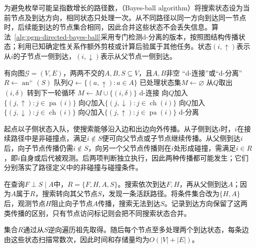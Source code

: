 为避免枚举可能呈指数增长的路径数，（Bayes-ball algorithm）将搜索状态设为当前节点及到达方向，相同状态只处理一次。从不同路径以同一方向到达同一节点时，后续能到达的节点集合相同，因此合并这些状态不会丢失信息。算法~\ref{alg:pgm-directed-bayes-ball}采用专门检测d-分离的版本，按照图结构传播状态；利用已知确定性关系作额外剪枝或计算后验属于其他任务。状态$(i,\uparrow)$表示从$i$的子节点一侧到达，$(i,\downarrow)$表示从父节点一侧到达。

\begin{algorithm}
  \label{alg:pgm-directed-bayes-ball}
  \begin{algorithmic}[1]
    \Require 有向图$\mathcal{G}=(V,E)$，两两不交的$A,B,S\subseteq V$，且$A,B$非空
    \Ensure “d-连接”或“d-分离”
    \State $R\gets\operatorname{an}^{+}(S)$
    \State 队列$Q\gets\{(a,\uparrow):a\in A\}$
    \State 已处理状态集$M\gets\varnothing$
      \State 从$Q$取出$(i,\delta)$
        \State 转到下一轮循环
      \EndIf
      \State $M\gets M\cup\{(i,\delta)\}$
        \State \Return d-连接
      \EndIf
        \State 向$Q$加入$\{(j,\uparrow):j\in\operatorname{pa}(i)\}$
        \State 向$Q$加入$\{(j,\downarrow):j\in\operatorname{ch}(i)\}$
      \ElsIf{$\delta=\downarrow$}
          \State 向$Q$加入$\{(j,\downarrow):j\in\operatorname{ch}(i)\}$
        \EndIf
          \State 向$Q$加入$\{(j,\uparrow):j\in\operatorname{pa}(i)\}$
        \EndIf
      \EndIf
    \EndWhile
    \State \Return d-分离
  \end{algorithmic}
\end{algorithm}

起点以子侧状态入队，使搜索能够沿入边和出边向外传播。从子侧到达$i$时，$i$在接续路径中是非碰撞点，满足$i\notin S$便可向父节点或子节点继续传播。从父侧到达$i$后，向子节点传播仍需$i\notin S$，向另一个父节点传播则在$i$处形成碰撞，需满足$i\in R$，即$i$自身或后代被观测。后两项判断独立执行，因此两种传播都可能发生；它们分别落实了路径定义中的非碰撞与碰撞条件。

在查询$F\perp S\mid A$中，$R=\{F,H,A,S\}$。搜索依次到达$F,H$，再从父侧到达$A$；因为$A$属于$R$，搜索转向其父节点$S$，发现一条活跃路径。将条件集合改为$\{H,A\}$后，观测节点$H$阻止向子节点$A$传播，搜索无法到达$S$。记录到达方向保留了这两类传播的区别，只有节点访问标记则会把不同搜索状态合并。

集合$R$通过从$S$逆向遍历祖先取得。随后每个节点至多处理两个到达状态，每条边由这些状态扫描常数次，因此时间和存储量均为$O(|V|+|E|)$。

